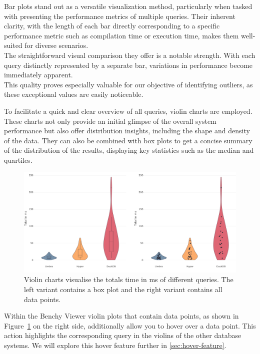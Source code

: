 Bar plots stand out as a versatile visualization method, particularly when tasked with presenting the performance metrics of multiple queries. Their inherent clarity, with the length of each bar directly corresponding to a specific performance metric such as compilation time or execution time, makes them well-suited for diverse scenarios.\\
The straightforward visual comparison they offer is a notable strength. With each query distinctly represented by a separate bar, variations in performance become immediately apparent.\\
This quality proves especially valuable for our objective of identifying outliers, as these exceptional values are easily noticeable.

To facilitate a quick and clear overview of all queries, violin charts are employed. These charts not only provide an initial glimpse of the overall system performance but also offer distribution insights, including the shape and density of the data. They can also be combined with box plots to get a concise summary of the distribution of the results, displaying key statistics such as the median and quartiles.

\begin{figure}[h]
    \centering
    \includegraphics[width=1\linewidth]{figures/bsp-violin-boxplot-points.png}
    \caption{Violin charts visualise the totals time in ms of different queries. The left variant contains a box plot and the right variant contains all data points.}
    \label{fig:violin-chart}
  \end{figure}

Within the Benchy Viewer violin plots that contain data points, as shown in Figure~\ref{fig:violin-chart} on the right side, additionally allow you to hover over a data point. This action highlights the corresponding query in the violins of the other database systems. We will explore this hover feature further in \ref{sec:hover-feature}.


